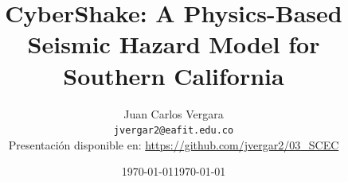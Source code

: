 

%
%
%




\date{\today}


\title[CyberShake] %
{\justifying CyberShake: A Physics-Based Seismic Hazard Model for Southern California}
\author[Vergara, Juan Carlos] %
{Juan Carlos Vergara\\ \texttt{\small jvergar2@eafit.edu.co}\\
{\tiny Presentación disponible en: \url{https://github.com/jvergar2/03_SCEC}}}
\date{\today}
\subject{Ingeniería Sísmica}




